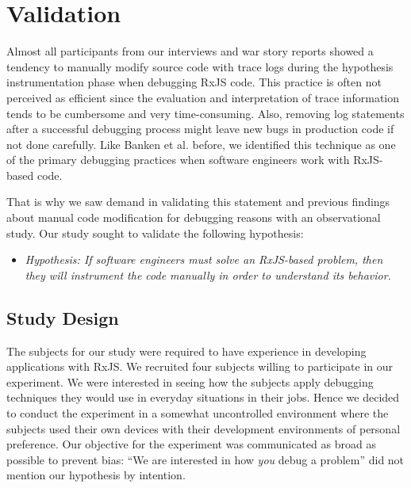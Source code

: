 \documentclass[sigplan,screen]{acmart}
\begin{document}
\section{Validation}
\label{sec:study}

Almost all participants from our interviews and war story reports showed a tendency to manually modify source code with trace logs during the hypothesis instrumentation phase when debugging RxJS code. This practice is often not perceived as efficient since the evaluation and interpretation of trace information tends to be cumbersome and very time-consuming. Also, removing log statements after a successful debugging process might leave new bugs in production code if not done carefully. Like Banken et al. \cite{10.1145/3180155.3180156} before, we identified this technique as one of the primary debugging practices when software engineers work with RxJS-based code.

That is why we saw demand in validating this statement and previous findings about manual code modification for debugging reasons with an observational study. Our study sought to validate the following hypothesis:

\begin{itemize}
	\item \emph{Hypothesis: If software engineers must solve an RxJS-based problem, then they will instrument the code manually in order to understand its behavior.}
\end{itemize}

\subsection{Study Design}

The subjects for our study were required to have experience in developing applications with RxJS. We recruited four subjects willing to participate in our experiment. We were interested in seeing how the subjects apply debugging techniques they would use in everyday situations in their jobs. Hence we decided to conduct the experiment in a somewhat uncontrolled environment where the subjects used their own devices with their development environments of personal preference. Our objective for the experiment was communicated as broad as possible to prevent bias: ``We are interested in how \emph{you} debug a problem'' did not mention our hypothesis by intention.
\end{document}
